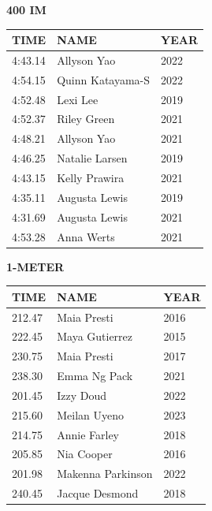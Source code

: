 \begin{table}[H]
\centering
\begin{minipage}[t]{0.6\textwidth}
\centering
\textbf{400 IM}\\[0.1cm]
\begin{tabular}{@{}p{1.8cm}p{2.8cm}p{1.2cm}@{}}
\hline
    \textbf{TIME} & \textbf{NAME} & \textbf{YEAR} \\
\hline
    4:43.14 & Allyson Yao & 2022 \\
    4:54.15 & Quinn Katayama-S & 2022 \\
    4:52.48 & Lexi Lee & 2019 \\
    4:52.37 & Riley Green & 2021 \\
    4:48.21 & Allyson Yao & 2021 \\
    4:46.25 & Natalie Larsen & 2019 \\
    4:43.15 & Kelly Prawira & 2021 \\
    4:35.11 & Augusta Lewis & 2019 \\
    4:31.69 & Augusta Lewis & 2021 \\
    4:53.28 & Anna Werts & 2021 \\
\hline
\end{tabular}
\end{minipage}
\end{table}

\begin{table}[H]
\centering
\begin{minipage}[t]{0.6\textwidth}
\centering
\textbf{1-METER}\\[0.1cm]
\begin{tabular}{@{}p{1.8cm}p{2.8cm}p{1.2cm}@{}}
\hline
    \textbf{TIME} & \textbf{NAME} & \textbf{YEAR} \\
\hline
    212.47 & Maia Presti & 2016 \\
    222.45 & Maya Gutierrez & 2015 \\
    230.75 & Maia Presti & 2017 \\
    238.30 & Emma Ng Pack & 2021 \\
    201.45 & Izzy Doud & 2022 \\
    215.60 & Meilan Uyeno & 2023 \\
    214.75 & Annie Farley & 2018 \\
    205.85 & Nia Cooper & 2016 \\
    201.98 & Makenna Parkinson & 2022 \\
    240.45 & Jacque Desmond & 2018 \\
\hline
\end{tabular}
\end{minipage}
\end{table}

